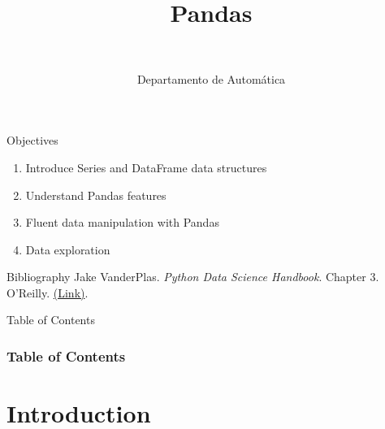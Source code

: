 \documentclass[10pt,compress]{beamer} %
\title[Pandas]{Pandas}
\author{\asignatura\\\carrera}
\institute{}
\date{Departamento de Automática}
\begin{document}
{\titlepageBlue
    \begin{frame}
        \titlepage
    \end{frame}
}

\institute{\asignatura}

\begin{frame}[plain]{}
	\begin{block}{Objectives}
		\begin{enumerate}
		\item Introduce Series and DataFrame data structures
		\item Understand Pandas features
		\item Fluent data manipulation with Pandas
		\item Data exploration
		\end{enumerate}
	\end{block}

   \begin{block}{Bibliography}
       Jake VanderPlas. \textit{Python Data Science Handbook}. Chapter 3. O'Reilly. \href{https://jakevdp.github.io/PythonDataScienceHandbook/}{(Link)}.
   \end{block}

\end{frame}

{
\begin{frame}[shrink]{Table of Contents}
 \frametitle{Table of Contents}
 \tableofcontents
\end{frame}
}

\section{Introduction}
\end{document}
